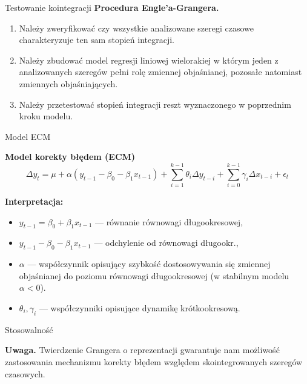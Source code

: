 \documentclass[a4paper, 11pt]{beamer}
\begin{document}
	\begin{frame}{Testowanie kointegracji}
		\textbf{Procedura Engle'a-Grangera.}
		\begin{enumerate}
			\item Należy zweryfikować czy wszystkie analizowane szeregi czasowe 
				charakteryzuje ten sam stopień integracji.
			\item Należy zbudować model regresji liniowej wielorakiej w którym 
				jeden z analizowanych szeregów pełni rolę zmiennej objaśnianej, 
				pozosałe natomiast zmiennych objaśniających.
			\item Należy przetestować stopień integracji reszt wyznaczonego w 
				poprzednim kroku modelu.
		\end{enumerate}
	\end{frame}
	
	\begin{frame}{Model ECM}
		\begin{block}{\textbf{Model korekty błędem (ECM)}}
			\[
				\Delta y_{t} =
					\mu +
					\alpha \left(y_{t-1} - \beta_{0} - \beta_{1} x_{t-1}\right) + 
					\sum_{i=1}^{k-1} \theta_{i} \Delta y_{t-i} + 
					\sum_{i=0}^{k-1} \gamma_{i} \Delta x_{t-i} + 
					\epsilon_{t}
			\]
		\end{block}
		\textbf{Interpretacja:}
		\begin{itemize}
			\item $y_{t-1} = \beta_{0} + \beta_{1} x_{t-1}$ --- równanie równowagi
				długookresowej,
			\item $y_{t-1} - \beta_{0} - \beta_{1} x_{t-1}$ --- odchylenie od 
				równowagi długookr.,
			\item $\alpha$ --- współczynnik opisujący szybkość dostosowywania się 
				zmiennej objaśnianej do poziomu równowagi długookresowej (w 
				stabilnym modelu $\alpha < 0$).
			\item $\theta_{i}, \gamma_{i}$ --- współczynniki opisujące dynamikę
				krótkookresową.
		\end{itemize}
	\end{frame}
	
	\begin{frame}{Stosowalność}
		\begin{alert}{\textbf{Uwaga.}}
			Twierdzenie Grangera o reprezentacji gwarantuje nam możliwość
			zastosowania mechanizmu korekty błędem względem skointegrowanych
			szeregów czasowych.
		\end{alert}
	\end{frame}
	
\end{document}
